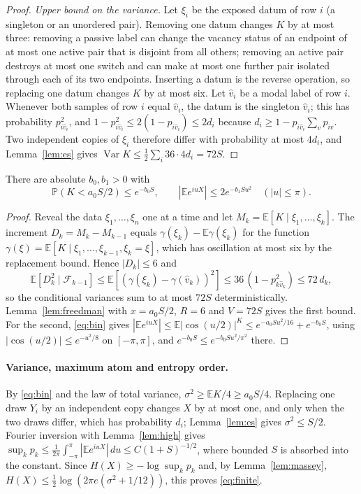 \documentclass[11pt,a4paper]{article}
\theoremstyle{definition}\newtheorem{remark}[theorem]{Remark}\newtheorem{conjecture}{Conjecture}
\newcommand{\E}{\mathbb E}\newcommand{\Prb}{\mathbb P}\newcommand{\Var}{\operatorname{Var}}
\begin{document}
\begin{proof}
\emph{Upper bound on the variance.} Let $\xi_i$ be the exposed datum of row $i$ (a singleton or an unordered pair). Removing one datum changes $K$ by at most three: removing a passive label can change the vacancy status of an endpoint of at most one active pair that is disjoint from all others; removing an active pair destroys at most one switch and can make at most one further pair isolated through each of its two endpoints. Inserting a datum is the reverse operation, so replacing one datum changes $K$ by at most six. Let $\hat v_i$ be a modal label of row $i$. Whenever both samples of row $i$ equal $\hat v_i$, the datum is the singleton $\hat v_i$; this has probability $p_{i\hat v_i}^2$, and $1-p_{i\hat v_i}^2\le2(1-p_{i\hat v_i})\le2d_i$ because $d_i\ge1-p_{i\hat v_i}\sum_vp_{iv}$. Two independent copies of $\xi_i$ therefore differ with probability at most $4d_i$, and Lemma~\ref{lem:es} gives $\Var K\le\tfrac12\sum_i36\cdot4d_i=72S$.
\end{proof}

\begin{lemma}\label{lem:high}
There are absolute $b_0,b_1>0$ with
\[
 \Prb(K<a_0 S/2)\le e^{-b_0S},\qquad
 |\E e^{iuX}|\le 2e^{-b_1Su^2}\quad (|u|\le\pi).
\]
\end{lemma}
\begin{proof}
Reveal the data $\xi_1,\ldots,\xi_n$ one at a time and let $M_k=\E[K\mid\xi_1,\ldots,\xi_k]$. The increment $D_k=M_k-M_{k-1}$ equals $\gamma(\xi_k)-\E\gamma(\xi_k)$ for the function $\gamma(\xi)=\E[K\mid\xi_1,\ldots,\xi_{k-1},\xi_k=\xi]$, which has oscillation at most six by the replacement bound. Hence $|D_k|\le6$ and
\[
\E[D_k^2\mid\mathcal F_{k-1}]\le\E[(\gamma(\xi_k)-\gamma(\hat v_k))^2]\le36\,(1-p_{k\hat v_k}^2)\le72\,d_k ,
\]
so the conditional variances sum to at most $72S$ deterministically. Lemma~\ref{lem:freedman} with $x=a_0S/2$, $R=6$ and $V=72S$ gives the first bound. For the second, \eqref{eq:bin} gives $|\E e^{iuX}|\le\E|\cos(u/2)|^K\le e^{-a_0Su^2/16}+e^{-b_0S}$, using $|\cos(u/2)|\le e^{-u^2/8}$ on $[-\pi,\pi]$, and $e^{-b_0S}\le e^{-b_0Su^2/\pi^2}$ there.
\end{proof}

\paragraph{Variance, maximum atom and entropy order.} By \eqref{eq:bin} and the law of total variance, $\sigma^2\ge\E K/4\ge a_0S/4$. Replacing one draw $Y_i$ by an independent copy changes $X$ by at most one, and only when the two draws differ, which has probability $d_i$; Lemma~\ref{lem:es} gives $\sigma^2\le S/2$. Fourier inversion with Lemma~\ref{lem:high} gives $\sup_kp_k\le\frac1{2\pi}\int_{-\pi}^{\pi}|\E e^{iuX}|\,du\le C(1+S)^{-1/2}$, where bounded $S$ is absorbed into the constant. Since $H(X)\ge-\log\sup_kp_k$ and, by Lemma~\ref{lem:massey}, $H(X)\le\tfrac12\log(2\pi e(\sigma^2+1/12))$, this proves \eqref{eq:finite}.
\end{document}
